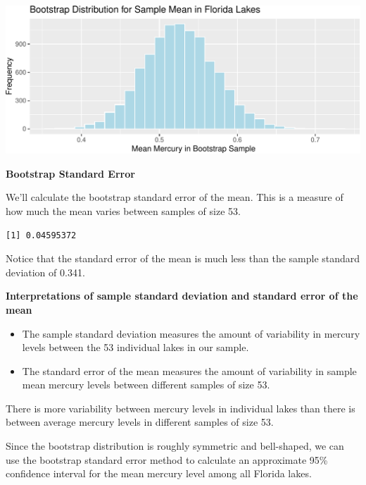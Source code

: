 \documentclass[
  letterpaper,
  DIV=11,
  numbers=noendperiod]{scrreprt}
\newenvironment{Shaded}{\begin{snugshade}}{\end{snugshade}}
\newcommand{\FunctionTok}[1]{\textcolor[rgb]{0.28,0.35,0.67}{#1}}
\newcommand{\NormalTok}[1]{\textcolor[rgb]{0.00,0.23,0.31}{#1}}
\newcommand{\OtherTok}[1]{\textcolor[rgb]{0.00,0.23,0.31}{#1}}
\newcommand{\SpecialCharTok}[1]{\textcolor[rgb]{0.37,0.37,0.37}{#1}}
\begin{document}
\includegraphics{Ch3_files/figure-pdf/unnamed-chunk-70-1.pdf}

\textbf{Bootstrap Standard Error}

We'll calculate the bootstrap standard error of the mean. This is a
measure of how much the mean varies between samples of size 53.

\begin{Shaded}
\end{Shaded}

\begin{verbatim}
[1] 0.04595372
\end{verbatim}

Notice that the standard error of the mean is much less than the sample
standard deviation of 0.341.

\textbf{Interpretations of sample standard deviation and standard error
of the mean}

\begin{itemize}
\item
  The sample standard deviation measures the amount of variability in
  mercury levels between the 53 individual lakes in our sample.
\item
  The standard error of the mean measures the amount of variability in
  sample mean mercury levels between different samples of size 53.
\end{itemize}

There is more variability between mercury levels in individual lakes
than there is between average mercury levels in different samples of
size 53.

Since the bootstrap distribution is roughly symmetric and bell-shaped,
we can use the bootstrap standard error method to calculate an
approximate 95\% confidence interval for the mean mercury level among
all Florida lakes.
\end{document}
